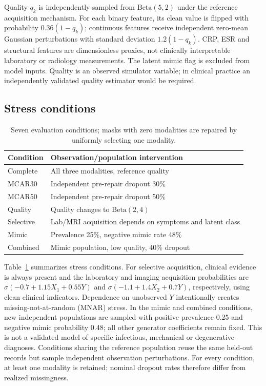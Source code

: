 \documentclass[conference]{IEEEtran}
\begin{document}
Quality $q_k$ is independently sampled from $\mathrm{Beta}(5,2)$ under the reference acquisition mechanism. For each binary feature, its clean value is flipped with probability $0.36(1-q_k)$; continuous features receive independent zero-mean Gaussian perturbations with standard deviation $1.2(1-q_k)$. CRP, ESR and structural features are dimensionless proxies, not clinically interpretable laboratory or radiology measurements. The latent mimic flag is excluded from model inputs. Quality is an observed simulator variable; in clinical practice an independently validated quality estimator would be required.
\subsection{Stress conditions}
\begin{table}[t]
\caption{Seven evaluation conditions; masks with zero modalities are repaired by uniformly selecting one modality.}
\label{tab:scen}
\centering\footnotesize
\begin{tabular}{@{}p{}p{}@{}}\toprule
Condition & Observation/population intervention\\\midrule
Complete & All three modalities, reference quality\\
MCAR30 & Independent pre-repair dropout 30\%\\
MCAR50 & Independent pre-repair dropout 50\%\\
Quality & Quality changes to $\mathrm{Beta}(2,4)$\\
Selective & Lab/MRI acquisition depends on symptoms and latent class\\
Mimic & Prevalence 25\%, negative mimic rate 48\%\\
Combined & Mimic population, low quality, 40\% dropout\\\bottomrule
\end{tabular}
\end{table}
Table~\ref{tab:scen} summarizes stress conditions. For selective acquisition, clinical evidence is always present and the laboratory and imaging acquisition probabilities are $\sigma(-0.7+1.15X_1+0.55Y)$ and $\sigma(-1.1+1.4X_2+0.7Y)$, respectively, using clean clinical indicators. Dependence on unobserved $Y$ intentionally creates missing-not-at-random (MNAR) stress. In the mimic and combined conditions, new independent populations are sampled with positive prevalence 0.25 and negative mimic probability 0.48; all other generator coefficients remain fixed. This is not a validated model of specific infectious, mechanical or degenerative diagnoses. Conditions sharing the reference population reuse the same held-out records but sample independent observation perturbations. For every condition, at least one modality is retained; nominal dropout rates therefore differ from realized missingness.
\end{document}
